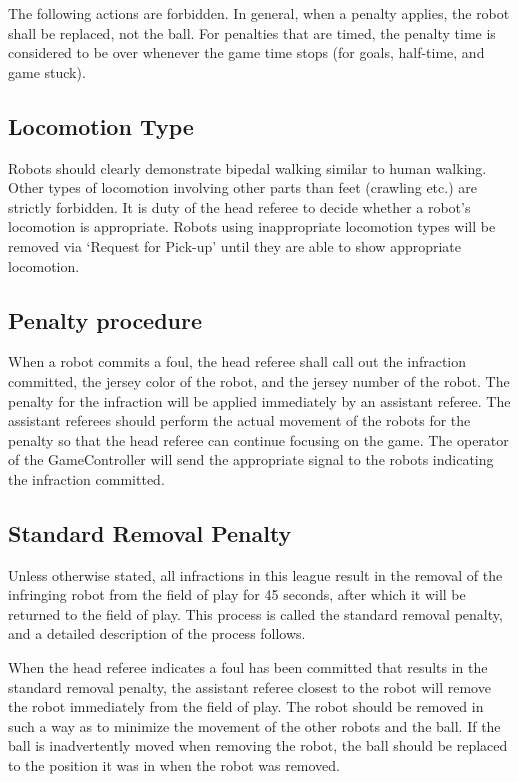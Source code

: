\documentclass[12pt]{article}
\begin{document}
The following actions are forbidden. In general, when a penalty applies, the robot shall be replaced, not the ball. For penalties that are timed, the penalty time is considered to be over whenever the game time stops (for goals, half-time, and game stuck).

\subsection{Locomotion Type}
\label{sec:locomotion_type}

Robots should clearly demonstrate bipedal walking similar to human walking. Other types of locomotion involving other parts than feet (crawling etc.) are strictly forbidden. It is duty of the head referee to decide whether a robot's locomotion is appropriate. Robots using inappropriate locomotion types will be removed via `Request for Pick-up' until they are able to show appropriate locomotion.

\subsection{Penalty procedure}
\label{sec:penalty_procedure}

When a robot commits a foul, the head referee shall call out the infraction committed, the jersey color of the robot, and the jersey number of the robot. The penalty for the infraction will be applied immediately by an assistant referee. The assistant referees should perform the actual movement of the robots for the penalty so that the head referee can continue focusing on the game. The operator of the GameController will send the appropriate signal to the robots indicating the infraction committed.

\subsection{Standard Removal Penalty}
\label{sec:removal_penalty}

Unless otherwise stated, all infractions in this league result in the removal of the infringing robot from the field of play for 45 seconds, after which it will be returned to the field of play. This process is called the standard removal penalty, and a detailed description of the process follows.

When the head referee indicates a foul has been committed that results in the standard removal penalty, the assistant referee closest to the robot will remove the robot immediately from the field of play. The robot should be removed in such a way as to minimize the movement of the other robots and the ball. If the ball is inadvertently moved when removing the robot, the ball should be replaced to the position it was in when the robot was removed.
\end{document}
